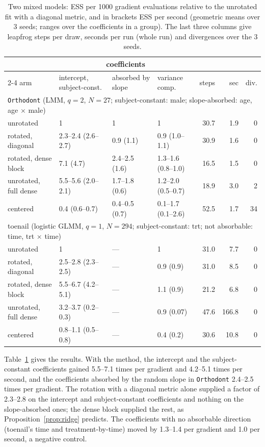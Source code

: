 \begin{table}[t]
\centering
\caption{Two mixed models: ESS per 1000 gradient evaluations relative to
the unrotated fit with a diagonal metric, and in brackets ESS per second
(geometric means over 3 seeds; ranges over the coefficients in a group).
The last three columns give leapfrog steps per draw, seconds per run
(whole run) and divergences over the 3 seeds.}
\label{tab:gen}
\footnotesize
\begin{tabular}{l lll rrr}
\toprule
& \multicolumn{3}{c}{coefficients} & & & \\
\cmidrule(lr){2-4}
arm & intercept, subject-const. & absorbed by slope & variance comp. & steps & sec & div. \\
\midrule
\multicolumn{7}{l}{\texttt{Orthodont} (LMM, $q = 2$, $N = 27$; subject-constant: male; slope-absorbed: age, age $\times$ male)} \\
unrotated           & 1 & 1 & 1 & 30.7 & 1.9 & 0 \\
rotated, diagonal   & 2.3--2.4 (2.6--2.7) & 0.9 (1.1)    & 0.9 (1.0--1.1)  & 30.9 & 1.6 & 0 \\
rotated, dense block & 7.1 (4.7)       & 2.4--2.5 (1.6)  & 1.3--1.6 (0.8--1.0) & 16.5 & 1.5 & 0 \\
unrotated, full dense & 5.5--5.6 (2.0--2.1) & 1.7--1.8 (0.6) & 1.2--2.0 (0.5--0.7) & 18.9 & 3.0 & 2 \\
centered             & 0.4 (0.6--0.7)   & 0.4--0.5 (0.7)  & 0.1--1.7 (0.1--2.6) & 52.5 & 1.7 & 34 \\
\midrule
\multicolumn{7}{l}{toenail (logistic GLMM, $q = 1$, $N = 294$; subject-constant: trt; not absorbable: time, trt $\times$ time)} \\
unrotated           & 1 & --- & 1 & 31.0 & 7.7 & 0 \\
rotated, diagonal   & 2.5--2.8 (2.3--2.5) & --- & 0.9 (0.9) & 31.0 & 8.5 & 0 \\
rotated, dense block & 5.5--6.7 (4.2--5.1) & --- & 1.1 (0.9) & 21.2 & 6.8 & 0 \\
unrotated, full dense & 3.2--3.7 (0.2--0.3) & --- & 0.9 (0.07) & 47.6 & 166.8 & 0 \\
centered             & 0.8--1.1 (0.5--0.8) & --- & 0.4 (0.2) & 30.6 & 10.8 & 0 \\
\bottomrule
\end{tabular}
\end{table}

Table~\ref{tab:gen} gives the results. With the method, the intercept and
the subject-constant coefficients gained 5.5--7.1 times per gradient and
4.2--5.1 times per second, and the coefficients absorbed by the random
slope in \texttt{Orthodont} 2.4--2.5 times per gradient. The rotation with
a diagonal metric alone supplied a factor of 2.3--2.8 on the intercept and
subject-constant coefficients and nothing on the slope-absorbed ones; the
dense block supplied the rest, as Proposition~\ref{prop:ridge} predicts.
The coefficients with no absorbable direction (toenail's time and
treatment-by-time) moved by 1.3--1.4 per gradient and 1.0 per second, a
negative control.

